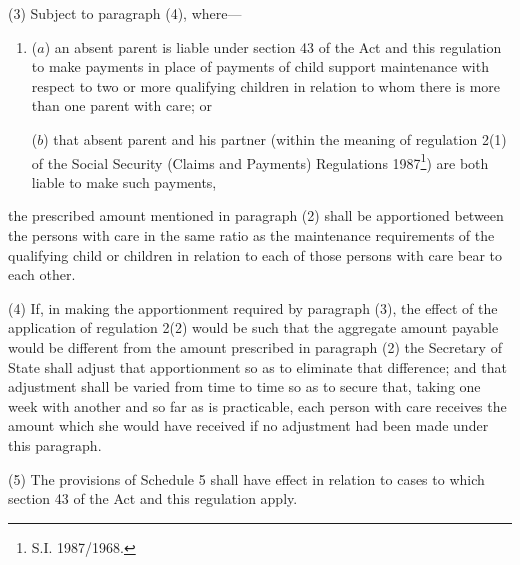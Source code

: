 \documentclass[12pt,a4paper]{article}
\begin{document}
(3) Subject to paragraph (4), where—
\begin{enumerate}\item[]
($a$) an absent parent is liable under section 43 of the Act and this regulation to make payments in place of payments of child support maintenance with respect to two or more qualifying children in relation to whom there is more than one parent with care; or

($b$) that absent parent and his partner (within the meaning of regulation 2(1) of the Social Security (Claims and Payments) Regulations 1987\footnote{\frenchspacing S.I. 1987/1968.}) are both liable to make such payments,
\end{enumerate}
the prescribed amount mentioned in paragraph (2) shall be apportioned between the persons with care in the same ratio as the maintenance requirements of the qualifying child or children in relation to each of those persons with care bear to each other.

(4) If, in making the apportionment required by paragraph (3), the effect of the application of regulation 2(2) would be such that the aggregate amount payable would be different from the amount prescribed in paragraph (2) the Secretary of State shall adjust that apportionment so as to eliminate that difference; and that adjustment shall be varied from time to time so as to secure that, taking one week with another and so far as is practicable, each person with care receives the amount which she would have received if no adjustment had been made under this paragraph.

(5) The provisions of Schedule 5 shall have effect in relation to cases to which section 43 of the Act and this regulation apply.

\end{document}
